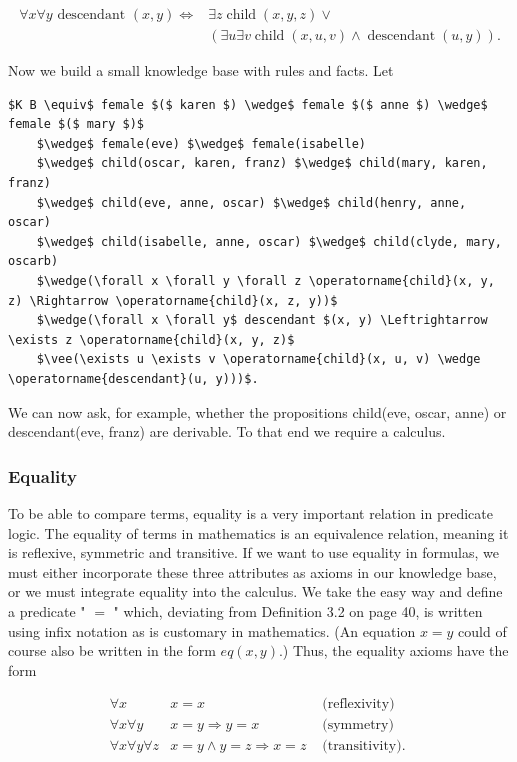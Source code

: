 \documentclass[10pt]{article}
\begin{document}
$$
\begin{aligned}
\forall x \forall y \text { descendant }(x, y) \Leftrightarrow & \exists z \operatorname{child}(x, y, z) \vee \\
& (\exists u \exists v \operatorname{child}(x, u, v) \wedge \operatorname{descendant}(u, y)) .
\end{aligned}
$$

Now we build a small knowledge base with rules and facts. Let

\begin{verbatim}
$K B \equiv$ female $($ karen $) \wedge$ female $($ anne $) \wedge$ female $($ mary $)$
    $\wedge$ female(eve) $\wedge$ female(isabelle)
    $\wedge$ child(oscar, karen, franz) $\wedge$ child(mary, karen, franz)
    $\wedge$ child(eve, anne, oscar) $\wedge$ child(henry, anne, oscar)
    $\wedge$ child(isabelle, anne, oscar) $\wedge$ child(clyde, mary, oscarb)
    $\wedge(\forall x \forall y \forall z \operatorname{child}(x, y, z) \Rightarrow \operatorname{child}(x, z, y))$
    $\wedge(\forall x \forall y$ descendant $(x, y) \Leftrightarrow \exists z \operatorname{child}(x, y, z)$
    $\vee(\exists u \exists v \operatorname{child}(x, u, v) \wedge \operatorname{descendant}(u, y)))$.
\end{verbatim}

We can now ask, for example, whether the propositions child(eve, oscar, anne) or descendant(eve, franz) are derivable. To that end we require a calculus.

\subsubsection*{Equality}
To be able to compare terms, equality is a very important relation in predicate logic. The equality of terms in mathematics is an equivalence relation, meaning it is reflexive, symmetric and transitive. If we want to use equality in formulas, we must either incorporate these three attributes as axioms in our knowledge base, or we must integrate equality into the calculus. We take the easy way and define a predicate " $=$ " which, deviating from Definition 3.2 on page 40, is written using infix notation as is customary in mathematics. (An equation $x=y$ could of course also be written in the form $e q(x, y)$.) Thus, the equality axioms have the form

\[
\begin{array}{rll}
\forall x & x=x & \text { (reflexivity) } \\
\forall x \forall y & x=y \Rightarrow y=x & \text { (symmetry) }  \tag{3.1}\\
\forall x \forall y \forall z & x=y \wedge y=z \Rightarrow x=z & \text { (transitivity). }
\end{array}
\]
\end{document}
